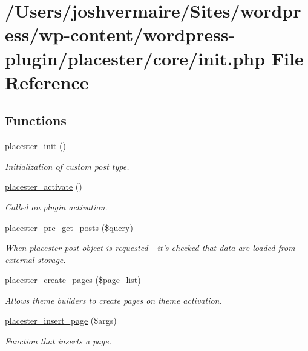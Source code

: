 \hypertarget{core_2init_8php}{
\section{/Users/joshvermaire/Sites/wordpress/wp-\/content/wordpress-\/plugin/placester/core/init.php File Reference}
\label{d1/d5e/core_2init_8php}
}
\subsection*{Functions}
\begin{DoxyCompactItemize}
\item 
\hyperlink{core_2init_8php_a5402d4ac05473bf1b21406e05ce01d5f}{placester\_\-init} ()
\begin{DoxyCompactList}\small\item\em Initialization of custom post type. \end{DoxyCompactList}\item 
\hyperlink{core_2init_8php_a13925a6ed0f132a5ccfd85b71a30b33c}{placester\_\-activate} ()
\begin{DoxyCompactList}\small\item\em Called on plugin activation. \end{DoxyCompactList}\item 
\hyperlink{core_2init_8php_a4e8d865a81bfa34db3ec925b2a3e00e0}{placester\_\-pre\_\-get\_\-posts} (\$query)
\begin{DoxyCompactList}\small\item\em When placester post object is requested -\/ it's checked that data are loaded from external storage. \end{DoxyCompactList}\item 
\hyperlink{core_2init_8php_a27f6bd90aa0faca0d560ebd98f52ab2f}{placester\_\-create\_\-pages} (\$page\_\-list)
\begin{DoxyCompactList}\small\item\em Allows theme builders to create pages on theme activation. \end{DoxyCompactList}\item 
\hyperlink{core_2init_8php_aee7bd915f6decd5447b2bc42e6d0fc86}{placester\_\-insert\_\-page} (\$args)
\begin{DoxyCompactList}\small\item\em Function that inserts a page. \end{DoxyCompactList}\item 

\end{DoxyCompactItemize}
